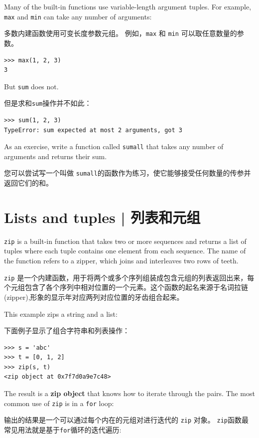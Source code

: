 %
Many of the built-in functions use
variable-length argument tuples.  For example, {\tt max}
and {\tt min} can take any number of arguments:

多数内建函数使用可变长度参数元组。 例如，\lstinline{max} 和 \lstinline{min} 可以取任意数量的参数。

 
 

\begin{lstlisting}
>>> max(1, 2, 3)
3
\end{lstlisting}
%
But {\tt sum} does not.

但是求和\lstinline{sum}操作并不如此：
 

\begin{lstlisting}
>>> sum(1, 2, 3)
TypeError: sum expected at most 2 arguments, got 3
\end{lstlisting}
%
As an exercise, write a function called {\tt sumall} that takes any number
of arguments and returns their sum.

您可以尝试写一个叫做 \lstinline{sumall}的函数作为练习，使它能够接受任何数量的传参并返回它们的和。

\section{Lists and tuples | 列表和元组}
 

{\tt zip} is a built-in function that takes two or more sequences and
returns a list of tuples where each tuple contains one
element from each sequence.  The name of the function refers to
a zipper, which joins and interleaves two rows of teeth.

\lstinline{zip} 是一个内建函数，用于将两个或多个序列组装成包含元组的列表返回出来，每个元组包含了各个序列中相对位置的一个元素。这个函数的起名来源于名词拉链(zipper),形象的显示年对应两列对应位置的牙齿组合起来。

This example zips a string and a list:

下面例子显示了组合字符串和列表操作：

\begin{lstlisting}
>>> s = 'abc'
>>> t = [0, 1, 2]
>>> zip(s, t)
<zip object at 0x7f7d0a9e7c48>
\end{lstlisting}
%
The result is a {\bf zip object} that knows how to iterate through
the pairs.  The most common use of {\tt zip} is in a {\tt for} loop:

输出的结果是一个可以通过每个内在的元组对进行迭代的 \lstinline{zip} 对象。 \lstinline{zip}函数最常见用法就是基于\lstinline{for}循环的迭代遍历:


